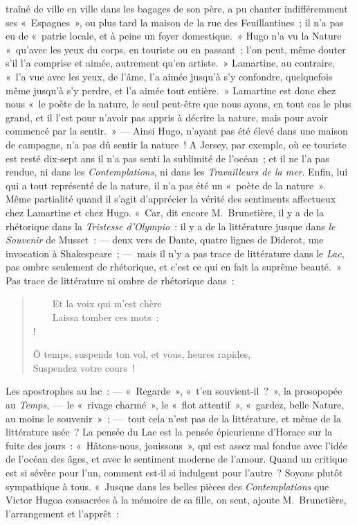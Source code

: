 \documentclass[french,twoside]{book} %
\begin{document}
\noindent traîné de ville en ville dans les bagages de son père, a pu chanter indifféremment ses « Espagnes », ou plus tard la maison de la rue des Feuillantines ; il n’a pas eu de « patrie locale, et à peine un foyer domestique. » Hugo n’a vu la Nature « qu’avec les yeux du corps, en touriste ou en passant ; l’on peut, même douter s’il l’a comprise et aimée, autrement qu’en artiste. » Lamartine, au contraire, « l’a vue avec les yeux, de l’âme, l’a aimée jusqu’à s’y confondre, quelquefois même jusqu’à s’y perdre, et l’a aimée tout entière. » Lamartine est donc chez nous « le poète de la nature, le seul peut-être que nous ayons, en tout cas le plus grand, et il l’est pour n’avoir pas appris à décrire la nature, mais pour avoir commencé par la sentir. » — Ainsi Hugo, n’ayant pas été élevé dans une maison de campagne, n’a pas dû sentir la nature ! A Jersey, par exemple, où ce touriste est resté dix-sept ans il n’a pas senti la sublimité de l’océan ; et il ne l’a pas rendue, ni dans les \emph{Contemplations}, ni dans les \emph{Travailleurs de la mer}. Enfin, lui qui a tout représenté de la nature, il n’a pas été un « poète de la nature ». Même partialité quand il s’agit d’apprécier la vérité des sentiments affectueux chez Lamartine et chez Hugo. « Car, dit encore M. Brunetière, il y a de la rhétorique dans la \emph{Tristesse d’Olympio} : il y a de la littérature jusque dans \emph{le Souvenir} de Musset : — deux vers de Dante, quatre lignes de Diderot, une invocation à Shakespeare ; — mais il n’y a pas trace de littérature dans le \emph{Lac}, pas ombre seulement de rhétorique, et c’est ce qui en fait la suprême beauté. » Pas trace de littérature ni ombre de rhétorique dans :\par


\begin{verse}
    Et la voix qui m’est chère\\
    Laissa tomber ces mots :\\!

Ô temps, suspends ton vol, et vous, heures rapides,\\
Suspendez votre cours !\\
\end{verse}

\noindent Les apostrophes au lac : — « Regarde », « t’en souvient-il ? », la prosopopée au \emph{Temps}, — le « rivage charmé », le « flot attentif », « gardez, belle Nature, au moins le souvenir » ; — tout cela n’est pas de la littérature, et même de la littérature usée ? La pensée du Lac est la pensée épicurienne d’Horace sur la fuite des jours : « Hâtons-nous, jouissons », qui est assez mal fondue avec l’idée de l’océan des âges, et avec le sentiment moderne de l’amour. Quand un critique est si sévère pour l’un, comment est-il si indulgent pour l’autre ? Soyons plutôt sympathique à tous. « Jusque dans les belles pièces des \emph{Contemplations} que Victor Hugoa consacrées à la mémoire de sa fille, on sent, ajoute M. Brunetière, l’arrangement et l’apprêt :\par
\end{document}
